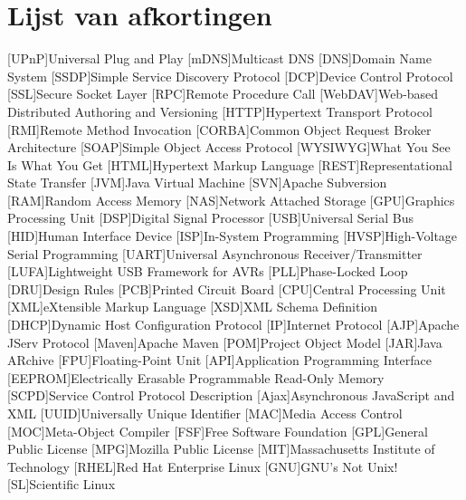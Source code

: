 %
%

\listoffigures


%
%

\lstlistoflistings


%
%

\chapter*{Lijst van afkortingen}

\begin{acronym}[WYSIWYG]	%

[UPnP]{Universal Plug and Play}
[mDNS]{Multicast DNS}
[DNS]{Domain Name System}
[SSDP]{Simple Service Discovery Protocol}
[DCP]{Device Control Protocol}
[SSL]{Secure Socket Layer}
[RPC]{Remote Procedure Call}
[WebDAV]{Web-based Distributed Authoring and Versioning}
[HTTP]{Hypertext Transport Protocol}
[RMI]{Remote Method Invocation}
[CORBA]{Common Object Request Broker Architecture}
[SOAP]{Simple Object Access Protocol}
[WYSIWYG]{What You See Is What You Get}
[HTML]{Hypertext Markup Language}
[REST]{Representational State Transfer}
[JVM]{Java Virtual Machine}
[SVN]{Apache Subversion}
[RAM]{Random Access Memory}
[NAS]{Network Attached Storage}
[GPU]{Graphics Processing Unit}
[DSP]{Digital Signal Processor}
[USB]{Universal Serial Bus}
[HID]{Human Interface Device}
[ISP]{In-System Programming}
[HVSP]{High-Voltage Serial Programming}
[UART]{Universal Asynchronous Receiver/Transmitter}
[LUFA]{Lightweight USB Framework for AVRs}
[PLL]{Phase-Locked Loop}
[DRU]{Design Rules}
[PCB]{Printed Circuit Board}
[CPU]{Central Processing Unit}
[XML]{eXtensible Markup Language}
[XSD]{XML Schema Definition}
[DHCP]{Dynamic Host Configuration Protocol}
[IP]{Internet Protocol}
[AJP]{Apache JServ Protocol}
[Maven]{Apache Maven}
[POM]{Project Object Model}
[JAR]{Java ARchive}
[FPU]{Floating-Point Unit}
[API]{Application Programming Interface}
[EEPROM]{Electrically Erasable Programmable Read-Only Memory}
[SCPD]{Service Control Protocol Description}
[Ajax]{Asynchronous JavaScript and XML}
[UUID]{Universally Unique Identifier}
[MAC]{Media Access Control}
[MOC]{Meta-Object Compiler}
[FSF]{Free Software Foundation}
[GPL]{General Public License}
[MPG]{Mozilla Public License}
[MIT]{Massachusetts Institute of Technology}
[RHEL]{Red Hat Enterprise Linux}
[GNU]{GNU's Not Unix!}
[SL]{Scientific Linux}
\end{acronym}
